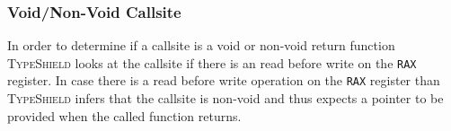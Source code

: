 %
\subsubsection{Void/Non-Void Callsite}
In order to determine if a callsite is a void or non-void return function
\textsc{TypeShield} looks at the callsite if there is an read before write on the \texttt{RAX} register. 
In case there is a read before write operation on the \texttt{RAX} register than
\textsc{TypeShield} infers that the callsite is non-void and thus expects a pointer to be provided 
when the called function returns.

